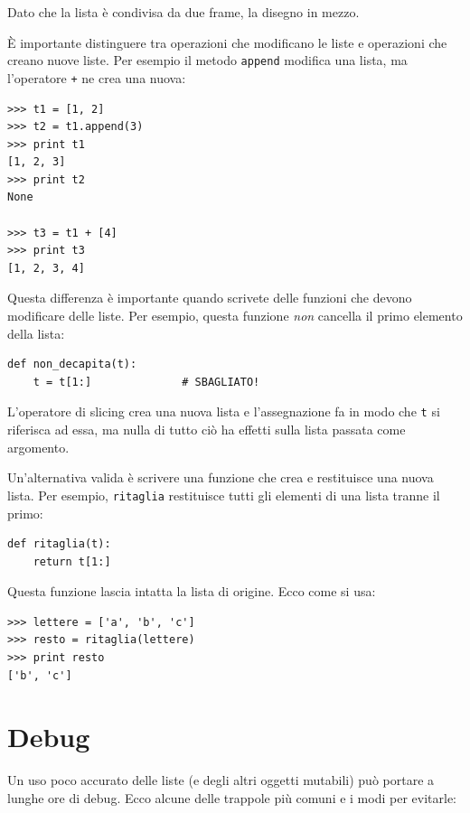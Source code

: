 \documentclass[10pt]{book}
\begin{document}
Dato che la lista è condivisa da due frame, la disegno in mezzo.

È importante distinguere tra operazioni che modificano le liste e operazioni che creano nuove liste. Per esempio il metodo {\tt append} modifica una lista, ma l'operatore {\tt +} ne crea una nuova:

\begin{verbatim}
>>> t1 = [1, 2]
>>> t2 = t1.append(3)
>>> print t1
[1, 2, 3]
>>> print t2
None

>>> t3 = t1 + [4]
>>> print t3
[1, 2, 3, 4]
\end{verbatim}

Questa differenza è importante quando scrivete delle funzioni che devono modificare delle liste. Per esempio, questa funzione
{\em non} cancella il primo elemento della lista:

\begin{verbatim}
def non_decapita(t):
    t = t[1:]              # SBAGLIATO!
\end{verbatim}

L'operatore di slicing crea una nuova lista e l'assegnazione fa in modo che {\tt t} si riferisca ad essa, ma nulla di tutto ciò ha effetti sulla lista passata come argomento.

Un'alternativa valida è scrivere una funzione che crea e restituisce una nuova lista. Per esempio, {\tt ritaglia} restituisce tutti gli elementi di una lista tranne il primo:

\begin{verbatim}
def ritaglia(t):
    return t[1:]
\end{verbatim}
%
Questa funzione lascia intatta la lista di origine. Ecco come si usa:

\begin{verbatim}
>>> lettere = ['a', 'b', 'c']
>>> resto = ritaglia(lettere)
>>> print resto
['b', 'c']
\end{verbatim}



\section{Debug}

Un uso poco accurato delle liste (e degli altri oggetti mutabili) può portare a lunghe ore di debug. Ecco alcune delle trappole più comuni e i modi per evitarle:
\end{document}
